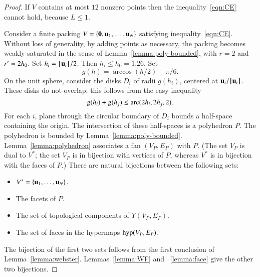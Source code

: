 \begin{proof} If $ V$ contains at most $12$ nonzero points then
the inequality~\ref{eqn:CE} cannot hold, because $L\le 1$.

Consider a finite packing $ V=\{{\mathbf 0}, {\mathbf u}_1,\ldots, {\mathbf u}_N\}$ satisfying inequality~\ref{eqn:CE}.   Without loss of generality, by adding points as necessary, the packing becomes weakly saturated in the sense of Lemma~\ref{lemma:poly-bounded}, with $r=2$ and $r'=2{h_0}$.  Set $h_i = {{\hskip0.1em|\hskip-0.15em|\hskip0.1em} {\mathbf u}_i{\hskip0.1em|\hskip-0.15em|\hskip0.1em}}/2$.  Then $h_i\le h_0=1.26$.  Set
$$
g(h) = \arccos(h/2) - \pi/6.
$$
On the unit sphere,  consider the disks $D_i$ of radii $g(h_i)$, centered at $ {\mathbf u}_i/{{\hskip0.1em|\hskip-0.15em|\hskip0.1em} {\mathbf u}_i{\hskip0.1em|\hskip-0.15em|\hskip0.1em}}$.  These disks do not overlap; this follows from the easy inequality~\cite[]{hales:2009:nonlinear} %
$$
g(h_i) + g(h_j) \le {\operatorname{arc}}(2h_i,2h_j,2).
$$
%
For each $i$, plane through the circular boundary of $D_i$ bounds a half-space containing the origin.  The intersection of these half-spaces is a polyhedron $P$.  The polyhedron is bounded by Lemma~\ref{lemma:poly-bounded}.   Lemma~\ref{lemma:polyhedron} associates a fan $(V_P,E_P)$ with $P$.    (The set $V_P$ is dual to $ V^*$; the set $V_P$ is in bijection with vertices of $P$, whereas $ V^*$ is in bijection with the faces of $P$.)  There are natural bijections between the following sets:
\begin{itemize}
\item $ V^* = \{ {\mathbf u}_1,\ldots, {\mathbf u}_N\}$.
\item The  facets of $P$.
\item The set of  topological components of $Y(V_P,E_P)$.
\item The set of faces in the hypermaps ${\operatorname{hyp}}(V_P,E_P)$.
\end{itemize}
The bijection of the first two sets follows from the first conclusion of Lemma~\ref{lemma:webster}.
Lemmas~\ref{lemma:WF} and ~\ref{lemma:face} give the other two bijections.


\end{proof}
